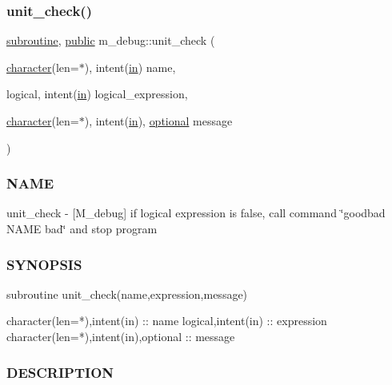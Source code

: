 \subsubsection{\texorpdfstring{unit\+\_\+check()}{unit\_check()}}
{\footnotesize\ttfamily \hyperlink{M__stopwatch_83_8txt_acfbcff50169d691ff02d4a123ed70482}{subroutine}, \hyperlink{M__stopwatch_83_8txt_a2f74811300c361e53b430611a7d1769f}{public} m\+\_\+debug\+::unit\+\_\+check (\begin{DoxyParamCaption}\item[{\hyperlink{option__stopwatch_83_8txt_abd4b21fbbd175834027b5224bfe97e66}{character}(len=$\ast$), intent(\hyperlink{M__journal_83_8txt_afce72651d1eed785a2132bee863b2f38}{in})}]{name,  }\item[{logical, intent(\hyperlink{M__journal_83_8txt_afce72651d1eed785a2132bee863b2f38}{in})}]{logical\+\_\+expression,  }\item[{\hyperlink{option__stopwatch_83_8txt_abd4b21fbbd175834027b5224bfe97e66}{character}(len=$\ast$), intent(\hyperlink{M__journal_83_8txt_afce72651d1eed785a2132bee863b2f38}{in}), \hyperlink{option__stopwatch_83_8txt_aa4ece75e7acf58a4843f70fe18c3ade5}{optional}}]{message }\end{DoxyParamCaption})}



\subsubsection*{N\+A\+ME}

unit\+\_\+check -\/ \mbox{[}M\+\_\+debug\mbox{]} if logical expression is false, call command \char`\"{}goodbad N\+A\+M\+E bad\char`\"{} and stop program 

\subsubsection*{S\+Y\+N\+O\+P\+S\+IS}

\begin{DoxyVerb}subroutine unit_check(name,expression,message)

 character(len=*),intent(in) :: name
 logical,intent(in) :: expression
 character(len=*),intent(in),optional :: message
\end{DoxyVerb}


\subsubsection*{D\+E\+S\+C\+R\+I\+P\+T\+I\+ON}

